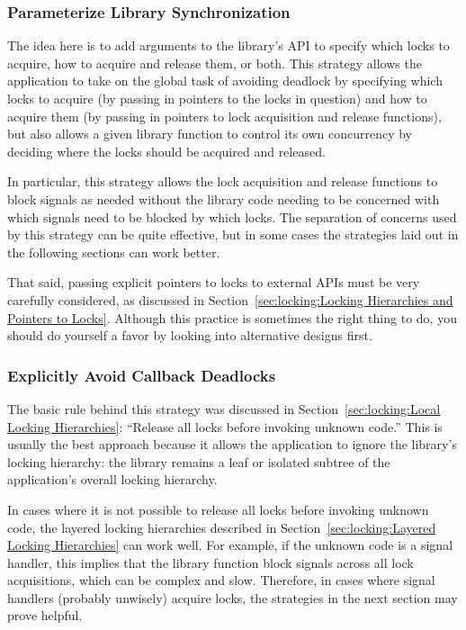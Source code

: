 \subsubsection{Parameterize Library Synchronization}
\label{sec:locking:Parameterize Library Synchronization}

The idea here is to add arguments to the library's API to specify
which locks to acquire, how to acquire and release them, or both.
This strategy allows the application to take on the global task of
avoiding deadlock by specifying which locks to acquire (by passing in
pointers to the locks in question) and how to
acquire them (by passing in pointers to lock acquisition and release
functions),
but also allows a given library function to control its own concurrency
by deciding where the locks should be acquired and released.

In particular, this strategy allows the lock acquisition and release
functions to block signals as needed without the library code needing to
be concerned with which signals need to be blocked by which locks.
The separation of concerns used by this strategy can be quite effective,
but in some cases the strategies laid out in the following sections
can work better.

That said, passing explicit pointers to locks to external APIs must
be very carefully considered, as discussed in
Section~\ref{sec:locking:Locking Hierarchies and Pointers to Locks}.
Although this practice is sometimes the right thing to do, you should do
yourself a favor by looking into alternative designs first.

\subsubsection{Explicitly Avoid Callback Deadlocks}
\label{sec:locking:Explicitly Avoid Callback Deadlocks}

The basic rule behind this strategy was discussed in
Section~\ref{sec:locking:Local Locking Hierarchies}: ``Release all
locks before invoking unknown code.''
This is usually the best approach because it allows the application to
ignore the library's locking hierarchy: the library remains a leaf or
isolated subtree of the application's overall locking hierarchy.

In cases where it is not possible to release all locks before invoking
unknown code, the layered locking hierarchies described in
Section~\ref{sec:locking:Layered Locking Hierarchies} can work well.
For example, if the unknown code is a signal handler, this implies that
the library function block signals across all lock acquisitions, which
can be complex and slow.
Therefore, in cases where signal handlers (probably unwisely) acquire
locks, the strategies in the next section may prove helpful.

